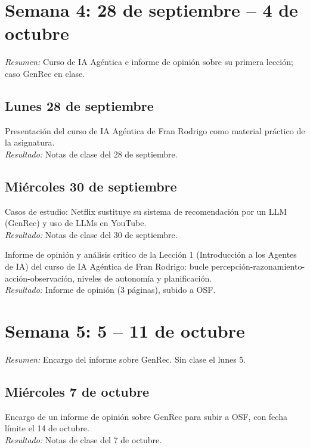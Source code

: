 \documentclass[11pt,a4paper]{article}
\newcommand{\actividad}[3]{\item[\textbf{[#1]}] #2 \\ \textit{Resultado:} #3}
\begin{document}
	\section*{Semana 4: 28 de septiembre -- 4 de octubre}
	\textit{Resumen:} Curso de IA Agéntica e informe de opinión sobre su primera lección; caso GenRec en clase.
	
	\subsection*{Lunes 28 de septiembre}
	\begin{description}[leftmargin=0pt, itemsep=6pt]
		\actividad{Clase}{Presentación del curso de IA Agéntica de Fran Rodrigo como material práctico de la asignatura.}{Notas de clase del 28 de septiembre.}
	\end{description}

	\subsection*{Miércoles 30 de septiembre}
	\begin{description}[leftmargin=0pt, itemsep=6pt]
		\actividad{Clase}{Casos de estudio: Netflix sustituye su sistema de recomendación por un LLM (GenRec) y uso de LLMs en YouTube.}{Notas de clase del 30 de septiembre.}
		\actividad{Documentación}{Informe de opinión y análisis crítico de la Lección 1 (Introducción a los Agentes de IA) del curso de IA Agéntica de Fran Rodrigo: bucle percepción-razonamiento-acción-observación, niveles de autonomía y planificación.}{Informe de opinión (3 páginas), subido a OSF.}
	\end{description}


	\section*{Semana 5: 5 -- 11 de octubre}
	\textit{Resumen:} Encargo del informe sobre GenRec. Sin clase el lunes 5.
	
	\subsection*{Miércoles 7 de octubre}
	\begin{description}[leftmargin=0pt, itemsep=6pt]
		\actividad{Clase}{Encargo de un informe de opinión sobre GenRec para subir a OSF, con fecha límite el 14 de octubre.}{Notas de clase del 7 de octubre.}
	\end{description}
\end{document}
